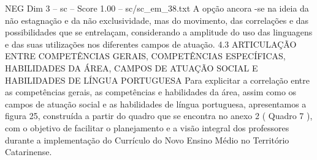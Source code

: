 \begin{textsample}{NEG Dim 3 – sc – Score 1.00 – sc/sc\_em\_38.txt}
A opção ancora -se na ideia da não estagnação e da não exclusividade, mas do movimento, das correlações e das possibilidades que se entrelaçam, considerando a amplitude do uso das linguagens e das suas utilizações nos diferentes campos de atuação. 4.3 ARTICULAÇÃO ENTRE COMPETÊNCIAS GERAIS, COMPETÊNCIAS ESPECÍFICAS, HABILIDADES DA ÁREA, CAMPOS DE ATUAÇÃO SOCIAL E HABILIDADES DE LÍNGUA PORTUGUESA Para explicitar a correlação entre as competências gerais, as competências e habilidades da área, assim como os campos de atuação social e as habilidades de língua portuguesa, apresentamos a figura 25, construída a partir do quadro que se encontra no anexo 2 ( Quadro 7 ), com o objetivo de facilitar o planejamento e a visão integral dos professores durante a implementação do Currículo do Novo Ensino Médio no Território Catarinense.

\end{textsample}
